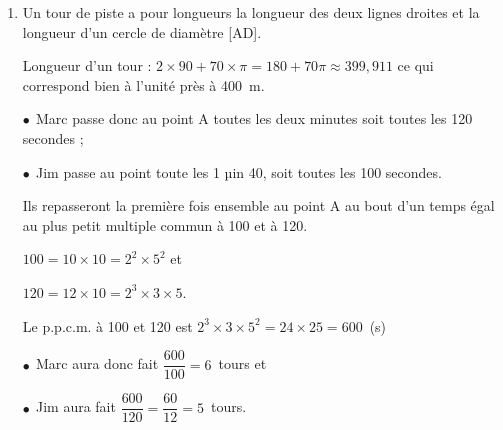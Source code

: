 \documentclass[10pt]{article}
\begin{document}

%
%
%

\begin{enumerate}[resume]
\item %
Un tour de piste a pour longueurs la longueur des deux lignes droites et la longueur d'un cercle de diamètre [AD].

Longueur d'un tour  : $2 \times 90 + 70 \times \pi = 180 + 70\pi \approx 399,911$ ce qui correspond bien à l'unité près à 400~m.

$\bullet~~$Marc passe donc au point A toutes les deux minutes soit toutes les 120 secondes ;

$\bullet~~$Jim passe au point toute les 1 µin 40, soit toutes les 100 secondes.

Ils repasseront la première fois ensemble au point A au bout d'un temps égal au plus petit multiple commun à 100 et à 120.

$100 = 10 \times 10 = 2^2 \times 5^2$ et 

$120 = 12 \times 10 = 2^3 \times 3 \times 5$.

Le p.p.c.m. à 100 et 120 est $2^3 \times 3 \times 5^2  = 24 \times 25 = 600$~(s)

$\bullet~~$Marc aura donc fait $\dfrac{600}{100} = 6$~tours et 

$\bullet~~$Jim aura fait $\dfrac{600}{120} = \dfrac{60}{12} = 5$~tours.
\smallskip

\end{enumerate}

\vspace{0.5cm}
\end{document}
